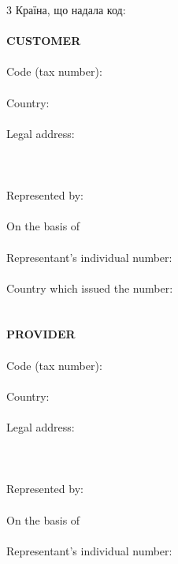 \begin{Form}
\begin{paracol}{3}
{        Країна, що надала код:\\
        \\
        }
        {\textbf{CUSTOMER}\\
        \\
        Code (tax number):\\
        \\
        Country:\\
        \\
        Legal address:\\
        \\
        \\
        \\
        Represented by:\\
        \\
        On the basis of\\
        \\
        Representant's individual number:\\
        \\
        Country which issued the number:\\
        \\
        \\
        \textbf{PROVIDER}\\
        \\
        Code (tax number):\\
        \\
        Country:\\
        \\
        Legal address:\\
        \\
        \\
        \\
        Represented by:\\
        \\
        On the basis of\\
        \\
        Representant's individual number:\\
}
\end{paracol}
\end{Form}
